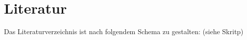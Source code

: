 \documentclass[11pt,captions=tableheading]{scrartcl}
\begin{document}

\setcounter{page}{1}
\tableofcontents
\setcounter{tocdepth}{3}
\clearscrheadfoot
\pagestyle{scrheadings}
\cfoot[]{} 
\ofoot[\pagemark]{\pagemark}
\newpage
{}
\setcounter{page}{1}








%
%

\section{Literatur}
Das Literaturverzeichnis ist nach folgendem Schema zu gestalten: (siehe Skritp)\\



\end{document}
